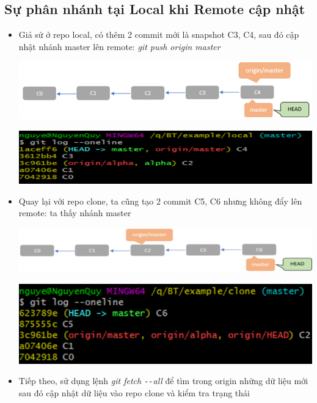 \documentclass[12pt,a4paper]{report}
\begin{document}
\subsection{Sự phân nhánh tại Local khi Remote cập nhật} 
\begin{itemize}
\item Giả sử ở repo local, có thêm 2 commit mới là snapshot C3, C4, sau đó cập nhật nhánh master lên remote: {\it git push origin master}


 	\includegraphics[width=0.8\linewidth]{screenshot069}

 	\label{fig:screenshot069}

 	\includegraphics[width=0.8\linewidth]{screenshot070}
 
 	\label{fig:screenshot070}
\item Quay lại với repo clone, ta cũng tạo 2 commit C5, C6 nhưng không đẩy lên remote: ta thấy nhánh master 
 
 	\includegraphics[width=0.8\linewidth]{screenshot071}
 
 	\label{fig:screenshot071}
 
 	\includegraphics[width=0.8\linewidth]{screenshot072}
 
 	\label{fig:screenshot072}

\item Tiếp theo, sử dụng lệnh {\it git fetch \texttt{-{}-}all} để  tìm trong origin những dữ liệu mới sau đó cập nhật dữ liệu vào repo clone và kiểm tra trạng thái


\end{itemize}
\end{document}
